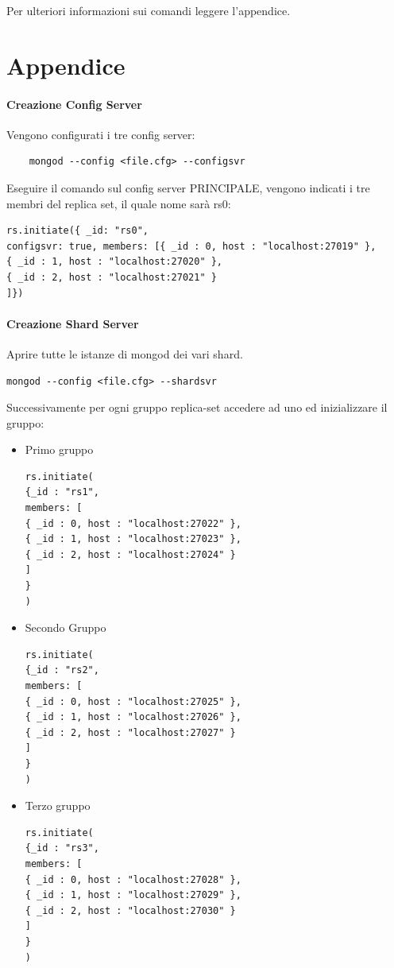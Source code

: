 \documentclass[10pt, a4paper,openany]{article}
\begin{document}
Per ulteriori informazioni sui comandi leggere l'appendice.

\section*{Appendice}

\paragraph{Creazione Config Server\\}
Vengono configurati i tre config server:
\begin{Verbatim}
	mongod --config <file.cfg> --configsvr
\end{Verbatim}

Eseguire il comando sul config server PRINCIPALE, vengono indicati i tre membri del replica set, il quale nome sarà rs0:
\begin{Verbatim}
rs.initiate({ _id: "rs0", 
configsvr: true, members: [{ _id : 0, host : "localhost:27019" },
{ _id : 1, host : "localhost:27020" },
{ _id : 2, host : "localhost:27021" }
]})
\end{Verbatim}

\paragraph{Creazione Shard Server\\} Aprire tutte le istanze di mongod dei vari shard.

\begin{Verbatim}
mongod --config <file.cfg> --shardsvr
\end{Verbatim}

Successivamente per ogni gruppo replica-set accedere ad uno ed inizializzare il gruppo:
\begin{itemize}
	\item Primo gruppo
\begin{Verbatim}
rs.initiate(
{_id : "rs1",
members: [
{ _id : 0, host : "localhost:27022" },
{ _id : 1, host : "localhost:27023" },
{ _id : 2, host : "localhost:27024" }
]
}
)
\end{Verbatim}
	\item Secondo Gruppo
\begin{Verbatim}
rs.initiate(
{_id : "rs2",
members: [
{ _id : 0, host : "localhost:27025" },
{ _id : 1, host : "localhost:27026" },
{ _id : 2, host : "localhost:27027" }
]
}
)
\end{Verbatim}

	\item Terzo gruppo
\begin{Verbatim}
rs.initiate(
{_id : "rs3",
members: [
{ _id : 0, host : "localhost:27028" },
{ _id : 1, host : "localhost:27029" },
{ _id : 2, host : "localhost:27030" }
]
}
)
\end{Verbatim}

\end{itemize}
\end{document}
